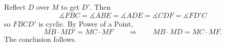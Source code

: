 Reflect $D$ over $M$ to get $D'$. Then \[\measuredangle{FBC}=\measuredangle{ABE}=\measuredangle{ADE}=\measuredangle{CDF}=\measuredangle{FD'C}\] so $FBCD'$ is cyclic. By Power of a Point, \[MB\cdot MD'=MC\cdot MF\qquad\Longrightarrow\qquad MB\cdot MD=MC\cdot MF.\] The conclusion follows.